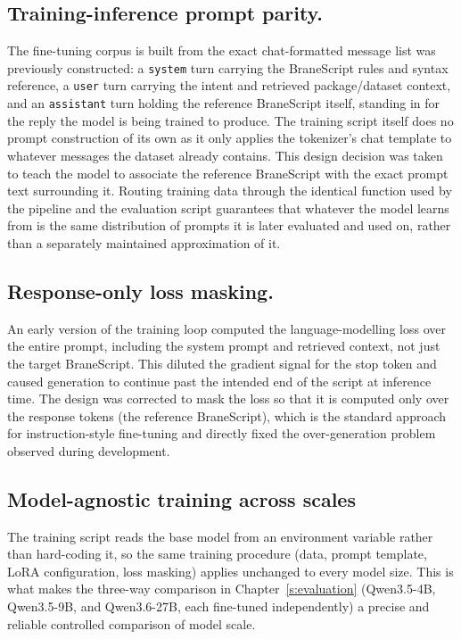 \subsection{Training-inference prompt parity.} 
The fine-tuning corpus is built from the exact
chat-formatted message list was previously constructed: a \texttt{system} turn carrying the
BraneScript rules and syntax reference, a \texttt{user} turn carrying the
intent and retrieved package/dataset context, and an \texttt{assistant} turn
holding the reference BraneScript itself, standing in for the reply the
model is being trained to produce. The training script itself does no
prompt construction of its own as it only applies the tokenizer's chat
template to whatever messages the dataset already contains. This
design decision was taken to teach the model to associate the
reference BraneScript with the exact prompt text surrounding it. Routing
training data through the identical function used by the pipeline and the
evaluation script guarantees that whatever the model learns from is the same
distribution of prompts it is later evaluated and used on, rather than a
separately maintained approximation of it.

\subsection{Response-only loss masking.} 
An early version of the training loop
computed the language-modelling loss over the entire prompt, including the
system prompt and retrieved context, not just the target BraneScript. This
diluted the gradient signal for the stop token and caused generation to
continue past the intended end of the script at inference time. The design was
corrected to mask the loss so that it is computed only over the response
tokens (the reference BraneScript), which is the standard approach for
instruction-style fine-tuning and directly fixed the over-generation problem
observed during development.

\subsection{Model-agnostic training across scales} The training script reads the
base model from an environment variable rather than hard-coding it, so the
same training procedure (data, prompt template, LoRA configuration, loss
masking) applies unchanged to every model size. This is what makes the
three-way comparison in Chapter~\ref{s:evaluation} (Qwen3.5-4B, Qwen3.5-9B,
and Qwen3.6-27B, each fine-tuned independently) a precise and reliable controlled comparison of
model scale.

